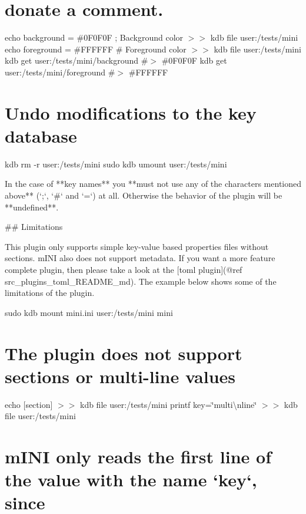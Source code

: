 \hypertarget{autotoc_md377_autotoc_md392}{}\section{donate a comment.}\label{autotoc_md377_autotoc_md392}
echo \textquotesingle{}background = \#0\+F0\+F0F ; Background color\textquotesingle{} $>$$>$ {\ttfamily kdb file user\+:/tests/mini} echo \textquotesingle{}foreground = \#F\+F\+F\+F\+FF \# Foreground color\textquotesingle{} $>$$>$ {\ttfamily kdb file user\+:/tests/mini} kdb get user\+:/tests/mini/background \#$>$ \#0\+F0\+F0F kdb get user\+:/tests/mini/foreground \#$>$ \#\+F\+F\+F\+F\+FF\hypertarget{autotoc_md377_autotoc_md393}{}\section{Undo modifications to the key database}\label{autotoc_md377_autotoc_md393}
kdb rm -\/r user\+:/tests/mini sudo kdb umount user\+:/tests/mini 
\begin{DoxyCode}
In the case of **key names** you **must not use any of the characters mentioned above** (`;`, `#` and `=`)
       at all. Otherwise the behavior of the plugin will be **undefined**.

## Limitations

This plugin only supports simple key-value based properties files without sections. mINI also does not
       support metadata. If you want a more feature complete plugin, then please take a look at the [toml plugin](@ref
       src\_plugins\_toml\_README\_md). The example below shows some of the limitations of the plugin.
\end{DoxyCode}
 sudo kdb mount mini.\+ini user\+:/tests/mini mini\hypertarget{autotoc_md377_autotoc_md394}{}\section{The plugin does not support sections or multi-\/line values}\label{autotoc_md377_autotoc_md394}
echo \textquotesingle{}\mbox{[}section\mbox{]}\textquotesingle{} $>$$>$ {\ttfamily kdb file user\+:/tests/mini} printf \textquotesingle{}key=\char`\"{}multi\textbackslash{}nline\char`\"{}\textquotesingle{} $>$$>$ {\ttfamily kdb file user\+:/tests/mini}\hypertarget{autotoc_md377_autotoc_md395}{}\section{m\+I\+N\+I only reads the first line of the value with the name `key`, since}\label{autotoc_md377_autotoc_md395}
